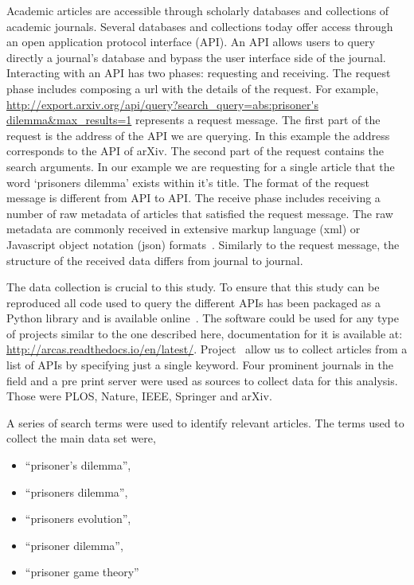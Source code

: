 \documentclass{article}
\theoremstyle{definition}
\begin{document}
Academic articles are accessible through scholarly databases and collections of
academic journals. Several databases and collections today offer access through
an open application protocol interface (API). An API allows users to query
directly a journal's database and bypass the user interface side of the journal.
Interacting with an API has two phases: requesting and receiving.
The request phase includes composing a url with the details of the request. For
example, \url{http://export.arxiv.org/api/query?search_query=abs:prisoner's dilemma&max_results=1}
represents a request message. The first part of the request is the address
of the API we are querying.
In this example the address corresponds to the API of arXiv.
The second part of the request contains the search arguments. In our example we
are requesting for a single article that the word `prisoners dilemma' exists within
it's title. The format of the request message is different from API to API.
The receive phase includes receiving a number of raw metadata of articles that
satisfied the request message. The raw metadata are commonly received in extensive markup
language (xml) or Javascript object notation (json) formats~\cite{nurseitov2009}.
Similarly to the request message, the structure of the received data differs from journal
to journal.

The data collection is crucial to this study. To ensure that this study can be
reproduced all code used to query the different APIs has been packaged as a Python library and is
available online~\cite{nikoleta_2017}. The software could be used for any type of
projects similar to the one described here, documentation for it is available at:
\url{http://arcas.readthedocs.io/en/latest/}.
Project~\cite{nikoleta_2017} allow us to collect articles from a list of APIs by
specifying just a single keyword. Four prominent journals in the field and a
pre print server were used as sources to collect data for this analysis. Those
were PLOS, Nature, IEEE, Springer and arXiv.

A series of search terms were used to identify relevant articles. The terms used
to collect the main data set were,

\begin{itemize}
    \item ``prisoner's dilemma'',
    \item ``prisoners dilemma'',
    \item ``prisoners evolution'',
    \item ``prisoner dilemma'',
    \item ``prisoner game theory''
\end{itemize}
\end{document}
